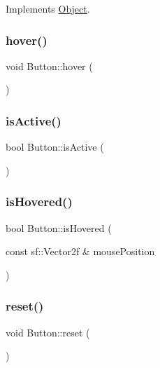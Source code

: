 Implements \mbox{\hyperlink{class_object_a3fd6370b8cfc53e5e41d09704726c2d4}{Object}}.

\mbox{\label{class_button_a1a5ca19ed8efe0ea27625217dcab9f2c}} 
\subsubsection{\texorpdfstring{hover()}{hover()}}
{\footnotesize\ttfamily void Button\+::hover (\begin{DoxyParamCaption}{ }\end{DoxyParamCaption})\hspace{0.3cm}{\ttfamily [inline]}}

\mbox{\label{class_button_acf2ea3a5fea9e6cb24b291fabab033ff}} 
\subsubsection{\texorpdfstring{isActive()}{isActive()}}
{\footnotesize\ttfamily bool Button\+::is\+Active (\begin{DoxyParamCaption}{ }\end{DoxyParamCaption})\hspace{0.3cm}{\ttfamily [inline]}}

\mbox{\label{class_button_a4d1a833e7e928d2fe25db3ba28f53e40}} 
\subsubsection{\texorpdfstring{isHovered()}{isHovered()}}
{\footnotesize\ttfamily bool Button\+::is\+Hovered (\begin{DoxyParamCaption}\item[{const sf\+::\+Vector2f \&}]{mouse\+Position }\end{DoxyParamCaption})}

\mbox{\label{class_button_ae34e8f3c482654e8585360fd639d02e3}} 
\subsubsection{\texorpdfstring{reset()}{reset()}}
{\footnotesize\ttfamily void Button\+::reset (\begin{DoxyParamCaption}{ }\end{DoxyParamCaption})\hspace{0.3cm}{\ttfamily [inline]}}


